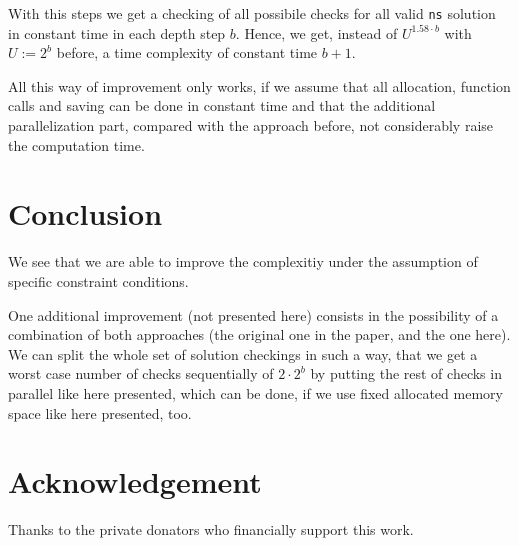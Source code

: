 \documentclass{article}
\newtheorem*{theorem A}{Theorem A}
\newtheorem*{theorem B}{N\"olker's Theorem}
\theoremstyle{remark}
\theoremstyle{remark}
\begin{document}
With this steps we get a checking of all possibile checks for all valid \texttt{ns} solution in constant time in each depth step $b$. Hence, we get, instead of $U^{1.58 \cdot b}$ with $U := 2^{b}$ before, a time complexity of constant time $b+1$.

All this way of improvement only works, if we assume that all allocation, function calls and saving can be done in constant time and that the additional parallelization part, compared with the approach before, not considerably raise the computation time.
\section*{Conclusion}
\label{s:conclusion}
We see that we are able to improve the complexitiy under the assumption of specific constraint conditions.

One additional improvement (not presented here) consists in the possibility of a combination of both approaches (the original one in the paper, and the one here). We can split the whole set of solution checkings in such a way, that we get a worst case number of checks sequentially of $2 \cdot 2^{b}$ by putting the rest of checks in parallel like here presented, which can be done, if we use fixed allocated memory space like here presented, too.
\section*{Acknowledgement}
\label{s:acknowledgement}
Thanks to the private donators who financially support this work.
\end{document}
